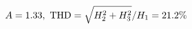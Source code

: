 \documentclass[preview]{standalone}
\begin{document}
\begin{align*}
\special{dvisvgm:raw <g id='unique000'>}A=1.33,\ \text{THD}=\sqrt{H_2^2+H_3^2}/H_1=21.2\%\special{dvisvgm:raw </g>}
\end{align*}
\end{document}
